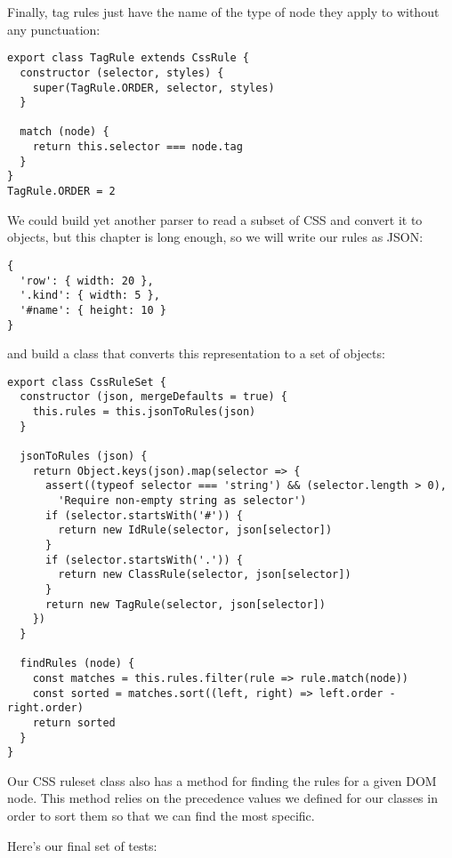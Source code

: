 \documentclass[krantzl]{krantz}
\begin{document}
Finally,
tag rules just have the name of the type of node they apply to without any punctuation:


\begin{lstlisting}[frame=single,frameround=tttt]
export class TagRule extends CssRule {
  constructor (selector, styles) {
    super(TagRule.ORDER, selector, styles)
  }

  match (node) {
    return this.selector === node.tag
  }
}
TagRule.ORDER = 2
\end{lstlisting}



We could build yet another parser to read a subset of CSS and convert it to objects,
but this chapter is long enough,
so we will write our rules as JSON:

\begin{lstlisting}[frame=single,frameround=tttt]
{
  'row': { width: 20 },
  '.kind': { width: 5 },
  '#name': { height: 10 }
}
\end{lstlisting}


\noindent and build a class that converts this representation to a set of objects:


\begin{lstlisting}[frame=single,frameround=tttt]
export class CssRuleSet {
  constructor (json, mergeDefaults = true) {
    this.rules = this.jsonToRules(json)
  }

  jsonToRules (json) {
    return Object.keys(json).map(selector => {
      assert((typeof selector === 'string') && (selector.length > 0),
        'Require non-empty string as selector')
      if (selector.startsWith('#')) {
        return new IdRule(selector, json[selector])
      }
      if (selector.startsWith('.')) {
        return new ClassRule(selector, json[selector])
      }
      return new TagRule(selector, json[selector])
    })
  }

  findRules (node) {
    const matches = this.rules.filter(rule => rule.match(node))
    const sorted = matches.sort((left, right) => left.order - right.order)
    return sorted
  }
}
\end{lstlisting}



Our CSS ruleset class also has a method for finding the rules for a given DOM node.
This method relies on the precedence values we defined for our classes
in order to sort them
so that we can find the most specific.


Here's our final set of tests:
\end{document}
